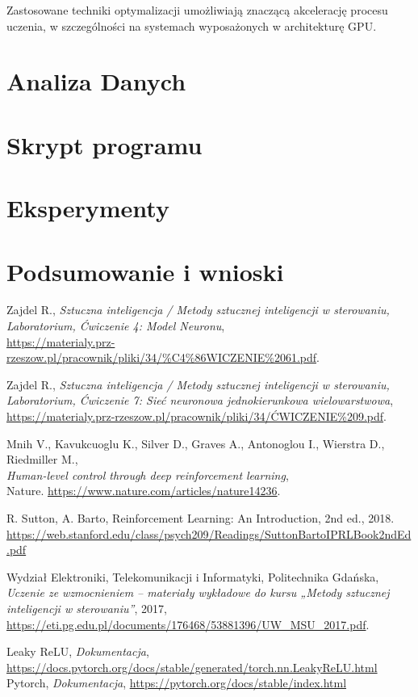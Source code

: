\documentclass[a4paper,12pt]{article}
\begin{document}
Zastosowane techniki optymalizacji umożliwiają znaczącą akcelerację procesu uczenia, w szczególności na systemach wyposażonych w architekturę GPU.
  \section{Analiza Danych}

  \section{Skrypt programu}

  \section{Eksperymenty}

  \section{Podsumowanie i wnioski}

\clearpage
  
\renewcommand{\refname}{Literatura}
\begin{thebibliography}{9}

Zajdel R., \textit{Sztuczna inteligencja / Metody sztucznej inteligencji w sterowaniu, Laboratorium, Ćwiczenie 4: Model Neuronu},\\
\url{https://materialy.prz-rzeszow.pl/pracownik/pliki/34/%C4%86WICZENIE%2061.pdf}.

Zajdel R., \textit{Sztuczna inteligencja / Metody sztucznej inteligencji w sterowaniu, Laboratorium, Ćwiczenie 7: Sieć neuronowa jednokierunkowa wielowarstwowa},\\
\url{https://materialy.prz-rzeszow.pl/pracownik/pliki/34/ĆWICZENIE%209.pdf}.

Mnih V., Kavukcuoglu K., Silver D., Graves A., Antonoglou I., Wierstra D., Riedmiller M.,\\
\textit{Human-level control through deep reinforcement learning},\\
Nature.
\url{https://www.nature.com/articles/nature14236}.

R. Sutton, A. Barto, Reinforcement Learning: An Introduction, 2nd ed., 2018. \url{https://web.stanford.edu/class/psych209/Readings/SuttonBartoIPRLBook2ndEd.pdf}

Wydział Elektroniki, Telekomunikacji i Informatyki, Politechnika Gdańska, \emph{Uczenie ze wzmocnieniem – materiały wykładowe do kursu „Metody sztucznej inteligencji w sterowaniu”}, 2017, \url{https://eti.pg.edu.pl/documents/176468/53881396/UW_MSU_2017.pdf}.

Leaky ReLU, \textit{Dokumentacja}, \url{https://docs.pytorch.org/docs/stable/generated/torch.nn.LeakyReLU.html} \\

Pytorch, \textit{Dokumentacja}, \url{https://pytorch.org/docs/stable/index.html} \\



\end{thebibliography}
\end{document}
